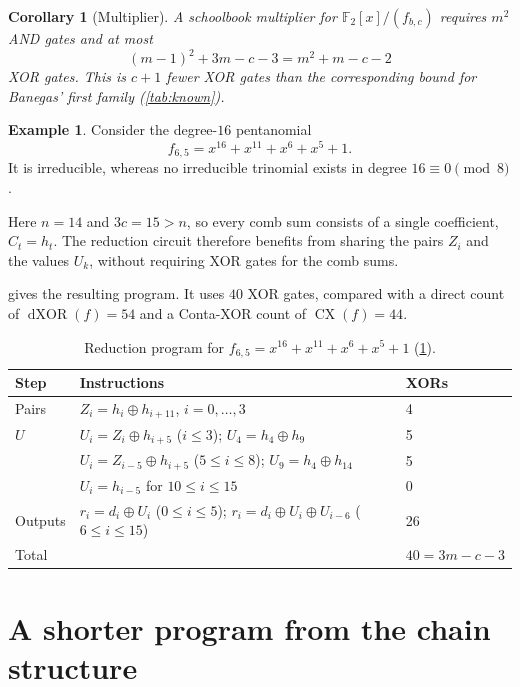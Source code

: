 \documentclass{ieeeaccess}
\theoremstyle{plain}
\newtheorem{corollary}[theorem]{Corollary}
\theoremstyle{definition}
\newtheorem{example}[theorem]{Example}
\newcommand{\F}{\mathbb{F}}
\newcommand{\dX}{\operatorname{dXOR}}
\newcommand{\CX}{\operatorname{CX}}
\newcommand{\xor}{\oplus}
\begin{document}
\begin{corollary}[Multiplier]\label{cor:mult}
A schoolbook multiplier for $\F_2[x]/(f_{b,c})$ requires $m^2$ AND gates and at
most
\[
  (m-1)^2+3m-c-3
  =m^2+m-c-2
\]
XOR gates. This is $c+1$ fewer XOR gates than the corresponding bound for
Banegas' first family (\cref{tab:known}).
\end{corollary}

\begin{example}\label{ex:16}
Consider the degree-$16$ pentanomial
\[
  f_{6,5}=x^{16}+x^{11}+x^6+x^5+1.
\]
It is irreducible, whereas no irreducible trinomial exists in degree
$16\equiv0\pmod8$.

Here $n=14$ and $3c=15>n$, so every comb sum consists of a single coefficient,
$C_t=h_t$. The reduction circuit therefore benefits from sharing the pairs $Z_i$
and the values $U_k$, without requiring XOR gates for the comb sums.

 gives the resulting program. It uses $40$ XOR gates, compared
with a direct count of $\dX(f)=54$ and a Conta-XOR count of $\CX(f)=44$.
\end{example}

\begin{table}[t]
\centering\small
\caption{Reduction program for
$f_{6,5}=x^{16}+x^{11}+x^6+x^5+1$
(\cref{ex:16}).}
\label{tab:ex16}
\begin{tabular}{@{}l l l@{}}
\toprule
Step & Instructions & XORs\\
\midrule
Pairs
  & $Z_i=h_i\xor h_{i+11}$, $i=0,\dots,3$
  & 4\\
$U$
  & $U_i=Z_i\xor h_{i+5}$ ($i\le3$);
    $U_4=h_4\xor h_9$
  & 5\\
  & $U_i=Z_{i-5}\xor h_{i+5}$ ($5\le i\le8$);
    $U_9=h_4\xor h_{14}$
  & 5\\
  & $U_i=h_{i-5}$ for $10\le i\le15$
  & 0\\
Outputs
  & $r_i=d_i\xor U_i$ ($0\le i\le5$);
    $r_i=d_i\xor U_i\xor U_{i-6}$ ($6\le i\le15$)
  & 26\\
\midrule
Total & & $40=3m-c-3$\\
\bottomrule
\end{tabular}
\end{table}


\section{A shorter program from the chain structure}\label{sec:chains}
\end{document}
